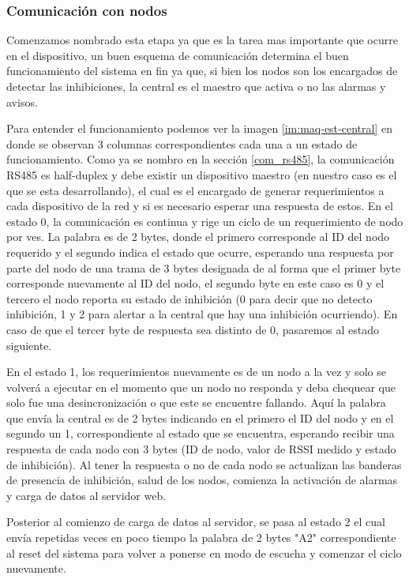 \subsubsection{Comunicación con nodos}
\par Comenzamos nombrado esta etapa ya que es la tarea mas importante que ocurre en el dispositivo, 
un buen esquema de comunicación determina el buen funcionamiento del sistema en fin ya que, si bien 
los nodos son los encargados de detectar las inhibiciones, la central es el maestro que activa o no
 las alarmas y avisos. 
\par Para entender el funcionamiento podemos ver la imagen \ref{im:maq-est-central} en donde se 
observan 3 columnas correspondientes cada una a un estado de funcionamiento.
Como ya se nombro en la sección \ref{com_rs485}, la comunicación RS485 es half-duplex y debe existir
 un dispositivo maestro (en nuestro caso es el que se esta desarrollando), el cual es el encargado 
 de generar requerimientos a cada dispositivo de la red y si es necesario esperar una respuesta de 
 estos. 
En el estado 0, la comunicación es continua y rige un ciclo de un requerimiento de nodo por ves. 
La palabra es de 2 bytes, donde el primero corresponde al ID del nodo requerido y el segundo indica 
el estado que ocurre, esperando una respuesta por parte del nodo de una trama de 3 bytes designada 
de al forma que el primer byte corresponde nuevamente al ID del nodo, el segundo byte en este caso 
es 0 y el tercero el nodo reporta su estado de inhibición (0 para decir que no detecto inhibición, 
1 y 2 para alertar a la central que hay una inhibición ocurriendo). En caso de que el tercer byte 
de respuesta sea distinto de 0, pasaremos al estado siguiente.
\par En el estado 1, los requerimientos nuevamente es de un nodo a la vez y solo se volverá a 
ejecutar en el momento que un nodo no responda y deba chequear que solo fue una desincronización 
o que este se encuentre fallando. Aquí la palabra que envía la central es de 2 bytes indicando en 
el primero el ID del nodo y en el segundo un 1, correspondiente al estado que se encuentra, esperando
 recibir una respuesta de cada nodo con 3 bytes (ID de nodo, valor de RSSI medido y estado de 
 inhibición). Al tener la respuesta o no de cada nodo se actualizan las banderas de presencia de 
 inhibición, salud de los nodos, comienza la activación de alarmas y carga de datos al servidor web.

\par Posterior al comienzo de carga de datos al servidor, se pasa al estado 2 el cual envía repetidas
 veces en poco tiempo la palabra de 2 bytes "A2" correspondiente al reset del sistema para volver a 
 ponerse en modo de escucha y comenzar el ciclo nuevamente. 

